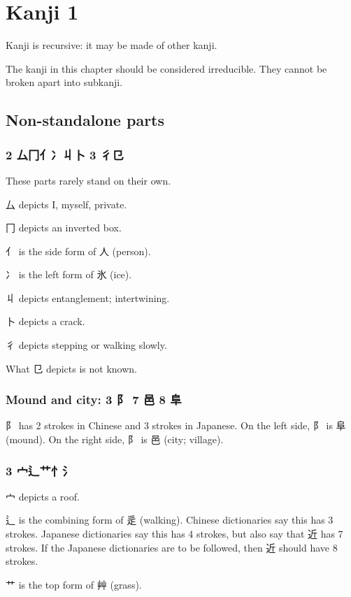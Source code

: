 \chapter{Kanji 1}

Kanji is recursive: it may be made of other kanji.

The kanji in this chapter should be considered irreducible.
They cannot be broken apart into subkanji.

\section{Non-standalone parts}

\subsection{2 厶冂亻冫丩卜 3 彳㔾}

These parts rarely stand on their own.

厶 depicts I, myself, private.

冂 depicts an inverted box.

亻 is the side form of 人 (person).

冫 is the left form of 氷 (ice).

丩 depicts entanglement; intertwining.

卜 depicts a crack.

彳 depicts stepping or walking slowly.

What 㔾 depicts is not known.

\subsection{Mound and city: 3 阝 7 邑 8 阜}

阝 has 2 strokes in Chinese and 3 strokes in Japanese.
On the left side, 阝 is 阜 (mound).
On the right side, 阝 is 邑 (city; village).

\subsection{3 宀辶艹忄氵}

宀 depicts a roof.

辶 is the combining form of 辵 (walking).
Chinese dictionaries say this has 3 strokes.
Japanese dictionaries say this has 4 strokes,
but also say that 近 has 7 strokes.
If the Japanese dictionaries are to be followed,
then 近 should have 8 strokes.

艹 is the top form of 艸 (grass).

